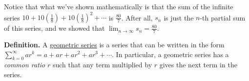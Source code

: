 \documentclass[main]{subfiles}
\begin{document}
\begin{enumerate}
\begin{enumerate}
\begin{solution}
      Notice that what we've shown mathematically is that the sum of the
      infinite series $10 + 10 \left( \frac{1}{8} \right) + 10 \left(
      \frac{1}{8} \right)^2 + \cdots$ is $\frac{80}{7}$.  After all,
      $s_n$ is just the $n$-th partial sum of this series, and we showed
      that $\displaystyle \lim_{n \to \infty} s_n = \frac{80}{7}$.
      \end{solution}

    \end{enumerate}
  \end{enumerate}
  \pspace{\newpage}
 \begin{problemonly}
  \begin{framed}
  \textbf{Definition.} A \uline{geometric series} is a series that can be
  written in the form $\displaystyle \sum_{k=0}^\infty ar^k = a + ar +
  ar^2 + ar^3 + \cdots$.  In particular, a geometric series has a \textit{common ratio} $r$ such that any term multiplied by $r$ gives the next term in the series.
  \end{framed}  
  \end{problemonly}
\end{document}
